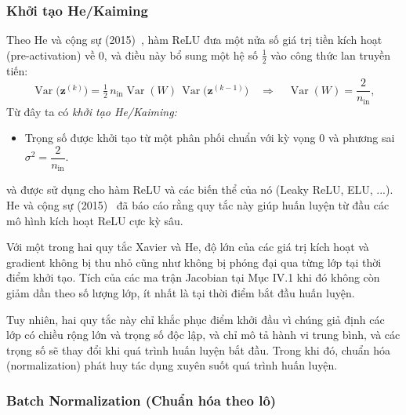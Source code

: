 \documentclass[12pt]{article}
\begin{document}
\subsubsection{Khởi tạo He/Kaiming}

Theo He và cộng sự (2015)~\cite{he2015rectifiers}, hàm ReLU đưa một nửa số giá trị tiền kích hoạt (pre-activation) về 0, và điều này bổ sung một hệ số $\frac{1}{2}$ vào công thức lan truyền tiến:
\[
\operatorname{Var}\big( \mathbf{z}^{(k)} \big) = \tfrac{1}{2}\, n_{\text{in}} \operatorname{Var}(W)\, \operatorname{Var}\big( \mathbf{z}^{(k-1)} \big)
\quad\Longrightarrow\quad
\operatorname{Var}(W) = \frac{2}{n_{\text{in}}},
\]
Từ đây ta có \textit{khởi tạo He/Kaiming:}
\begin{itemize}
    \item Trọng số được khởi tạo từ một phân phối chuẩn với kỳ vọng 0 và phương sai $\sigma^2 = \dfrac{2}{n_{\text{in}}}$.
\end{itemize}
và được sử dụng cho hàm ReLU và các biến thể của nó (Leaky ReLU, ELU, ...). He và cộng sự (2015)~\cite{he2015rectifiers} đã báo cáo rằng quy tắc này giúp huấn luyện từ đầu các mô hình kích hoạt ReLU cực kỳ sâu.

Với một trong hai quy tắc Xavier và He, độ lớn của các giá trị kích hoạt và gradient không bị thu nhỏ cũng như không bị phóng đại qua từng lớp tại thời điểm khởi tạo. Tích của các ma trận Jacobian tại Mục IV.1 khi đó không còn giảm dần theo số lượng lớp, ít nhất là tại thời điểm bắt đầu huấn luyện.

Tuy nhiên, hai quy tắc này chỉ khắc phục điểm khởi đầu vì chúng giả định các lớp có chiều rộng lớn và trọng số độc lập, và chỉ mô tả hành vi trung bình, và các trọng số sẽ thay đổi khi quá trình huấn luyện bắt đầu. Trong khi đó, chuẩn hóa (normalization) phát huy tác dụng xuyên suốt quá trình huấn luyện.

\subsubsection{Batch Normalization (Chuẩn hóa theo lô)}
\end{document}
